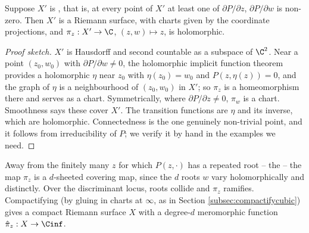 \begin{proposition}\label{prop:algebraicsurface}
	Suppose $X'$ is , that is, at every point of $X'$ at least one of
	$\partial P/\partial z$, $\partial P /\partial w$ is non-zero. Then $X'$ is a Riemann
	surface, with charts given by the coordinate projections, and
	$\pi_z : X' \to \C$, $(z,w)\mapsto z$, is holomorphic.
\end{proposition}

\begin{proof}[Proof sketch]
	$X'$ is Hausdorff and second countable as a subspace of $\C^2$. Near a point
	$(z_0,w_0)$ with $\partial P/\partial w \neq 0$, the holomorphic implicit function
	theorem provides a holomorphic $\eta$ near $z_0$ with $\eta(z_0)=w_0$ and
	$P(z,\eta(z))=0$, and the graph of $\eta$ is a neighbourhood of $(z_0,w_0)$ in $X'$; so
	$\pi_z$ is a homeomorphism there and serves as a chart. Symmetrically, where
	$\partial P/\partial z \neq 0$, $\pi_w$ is a chart. Smoothness says these cover $X'$.
	The transition functions are $\eta$ and its inverse, which are holomorphic. Connectedness
	is the one genuinely non-trivial point, and it follows from irreducibility of $P$; we
	verify it by hand in the examples we need.
\end{proof}

Away from the finitely many $z$ for which $P(z,\cdot)$ has a repeated root -- the
 -- the map $\pi_z$ is a $d$-sheeted covering map, since the $d$
roots $w$ vary holomorphically and distinctly. Over the discriminant locus, roots collide
and $\pi_z$ ramifies. Compactifying (by gluing in charts at $\infty$, as in Section
\ref{subsec:compactifycubic}) gives a compact Riemann surface $X$ with a degree-$d$
meromorphic function $\hat\pi_z : X \to \Cinf$.

